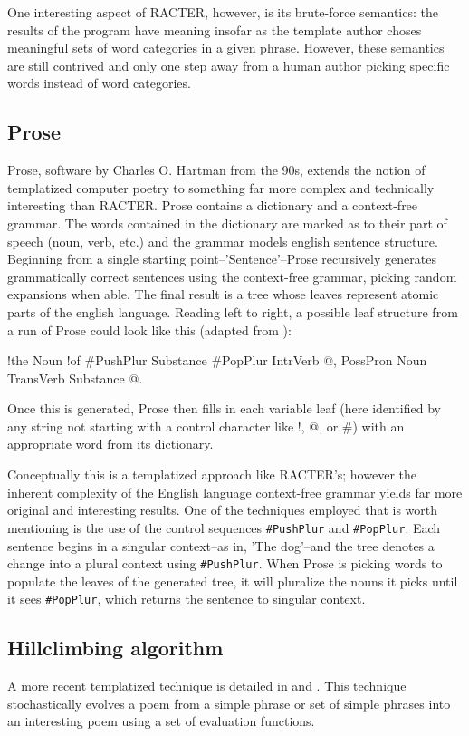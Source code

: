 \documentclass[10pt]{article}
\begin{document}
One interesting aspect of RACTER, however, is its brute-force semantics: the
results of the program have meaning insofar as the template author choses
meaningful sets of word categories in a given phrase. However, these semantics
are still contrived and only one step away from a human author picking specific
words instead of word categories.

\subsection{Prose} 
Prose, software by Charles O. Hartman from the 90s, extends
the notion of templatized computer poetry to something far more complex and
technically interesting than RACTER. Prose contains a dictionary and a
context-free grammar. The words contained in the dictionary are marked as to
their part of speech (noun, verb, etc.) and the grammar models english sentence
structure. Beginning from a single starting point--'Sentence'--Prose
recursively generates grammatically correct sentences using the context-free
grammar, picking random expansions when able. The final result is a tree whose
leaves represent atomic parts of the english language. Reading left to right, a
possible leaf structure from a run of Prose could look like this (adapted from
\cite{Hart96}):
\begin{center}
\begin{boxedverbatim} 
!the Noun !of #PushPlur Substance #PopPlur IntrVerb @, PossPron Noun TransVerb Substance @.
\end{boxedverbatim}
\end{center} 
Once this is generated, Prose then fills in each variable leaf (here identified
by any string not starting with a control character like !, @, or \#) with an
appropriate word from its dictionary.

Conceptually this is a templatized approach like RACTER's; however the inherent
complexity of the English language context-free grammar yields far more
original and interesting results. One of the techniques employed that is worth
mentioning is the use of the control sequences \verb|#PushPlur| and
\verb|#PopPlur|. Each sentence begins in a singular context--as in, 'The
dog'--and the tree denotes a change into a plural context using
\verb|#PushPlur|. When Prose is picking words to populate the leaves of the
generated tree, it will pluralize the nouns it picks until it sees
\verb|#PopPlur|, which returns the sentence to singular context.

\subsection{Hillclimbing algorithm}
A more recent templatized technique is detailed in \cite{Manurung00} and \cite{Manurung03}. This
technique stochastically evolves a poem from a simple phrase or set of simple
phrases into an interesting poem using a set of evaluation functions.
\end{document}
